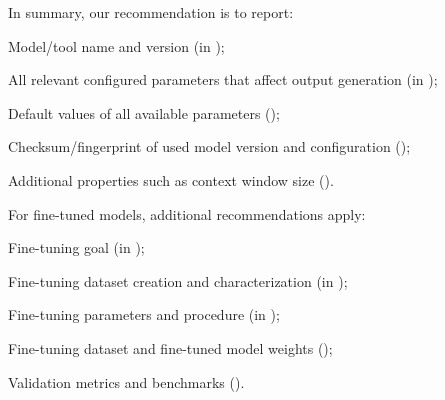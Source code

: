 In summary, our recommendation is to report:

\begin{enumerate*}[label=(\arabic*)]
\item Model/tool name and version (\must in \paper);
\item All relevant configured parameters that affect output generation (\must in \paper);
\item Default values of all available parameters (\should);
\item Checksum/fingerprint of used model version and configuration (\should);
\item Additional properties such as context window size (\should).
\end{enumerate*}

For fine-tuned models, additional recommendations apply:

\begin{enumerate*}[label=(\arabic*)]
\item Fine-tuning goal (\must in \paper);
\item Fine-tuning dataset creation and characterization (\must in \paper);
\item Fine-tuning parameters and procedure (\must in \paper);
\item Fine-tuning dataset and fine-tuned model weights (\should);
\item Validation metrics and benchmarks (\should).
\end{enumerate*}
